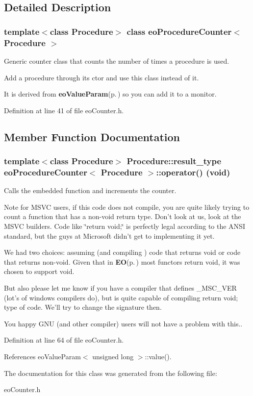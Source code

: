 \subsection{Detailed Description}
\subsubsection*{template$<$class Procedure$>$ class eo\-Procedure\-Counter$<$ Procedure $>$}

Generic counter class that counts the number of times a procedure is used. 

Add a procedure through its ctor and use this class instead of it.

It is derived from {\bf eo\-Value\-Param}{\rm (p.\,\pageref{classeo_value_param})} so you can add it to a monitor. 



Definition at line 41 of file eo\-Counter.h.

\subsection{Member Function Documentation}
\subsubsection{\setlength{\rightskip}{0pt plus 5cm}template$<$class Procedure$>$ Procedure::result\_\-type {\bf eo\-Procedure\-Counter}$<$ Procedure $>$::operator() (void)\hspace{0.3cm}{\tt  [inline]}}\label{classeo_procedure_counter_a1}


Calls the embedded function and increments the counter. 

Note for MSVC users, if this code does not compile, you are quite likely trying to count a function that has a non-void return type. Don't look at us, look at the MSVC builders. Code like \char`\"{}return void;\char`\"{} is perfectly legal according to the ANSI standard, but the guys at Microsoft didn't get to implementing it yet.

We had two choices: assuming (and compiling ) code that returns void or code that returns non-void. Given that in {\bf EO}{\rm (p.\,\pageref{class_e_o})} most functors return void, it was chosen to support void.

But also please let me know if you have a compiler that defines \_\-MSC\_\-VER (lot's of windows compilers do), but is quite capable of compiling return void; type of code. We'll try to change the signature then.

You happy GNU (and other compiler) users will not have a problem with this.. 

Definition at line 64 of file eo\-Counter.h.

References eo\-Value\-Param$<$ unsigned long $>$::value().

The documentation for this class was generated from the following file:\begin{CompactItemize}
\item 
eo\-Counter.h\end{CompactItemize}
